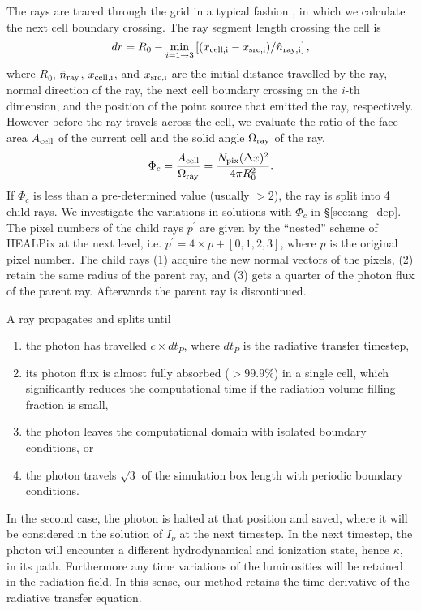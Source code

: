 \documentclass[12pt,preprint]{aastex}
\begin{document}
The rays are traced through the grid in a typical fashion
\citep[e.g.][]{Abel99_RT}, in which we calculate the next cell
boundary crossing.  The ray segment length crossing the cell is
%
\begin{equation}
  \label{eqn:trace}
  dr = R_0 - \min_{i=1 \rightarrow 3} \left[(x_{\rm cell,i} - x_{\rm src,i}) /
    \hat{n}_{\rm ray,i} \right],
\end{equation}
%
where $R_0$, $\hat{n}_{\rm ray}$, $x_{\rm cell,i}$, and $x_{\rm
  src,i}$ are the initial distance travelled by the ray, normal
direction of the ray, the next cell boundary crossing on the $i$-th
dimension, and the position of the point source that emitted the ray,
respectively.  However before the ray travels across the cell, we
evaluate the ratio of the face area $A_{\rm cell}$ of the current cell
and the solid angle $\Omega_{\rm ray}$ of the ray,
%
\begin{equation}
  \label{eqn:split}
  \Phi_c = \frac{A_{\rm cell}} {\Omega_{\rm ray}} = 
  \frac{N_{\rm pix} (\Delta x)^2} {4\pi R_0^2}.
\end{equation}
%
If $\Phi_c$ is less than a pre-determined value (usually $>2$), the
ray is split into 4 child rays.  We investigate the variations in
solutions with $\Phi_c$ in \S\ref{sec:ang_dep}.  The pixel numbers
of the child rays $p^\prime$ are given by the ``nested'' scheme of
HEALPix at the next level, i.e. $p^\prime = 4 \times p + [0,1,2,3]$,
where $p$ is the original pixel number.  The child rays (1) acquire
the new normal vectors of the pixels, (2) retain the same radius of
the parent ray, and (3) gets a quarter of the photon flux of the
parent ray.  Afterwards the parent ray is discontinued.

A ray propagates and splits until 
%
\begin{enumerate}
\item the photon has travelled $c \times dt_P$, where $dt_P$ is the
  radiative transfer timestep,
\item its photon flux is almost fully absorbed ($>99.9\%$) in a single
  cell, which significantly reduces the computational time if the
  radiation volume filling fraction is small,
\item the photon leaves the computational domain with isolated
  boundary conditions, or
\item the photon travels $\sqrt{3}$ of the simulation box length with
  periodic boundary conditions.
\end{enumerate}
%
In the second case, the photon is halted at that position and saved,
where it will be considered in the solution of $I_\nu$ at the next
timestep.  In the next timestep, the photon will encounter a different
hydrodynamical and ionization state, hence $\kappa$, in its path.
Furthermore any time variations of the luminosities will be retained
in the radiation field.  In this sense, our method retains the time
derivative of the radiative transfer equation.
\end{document}
